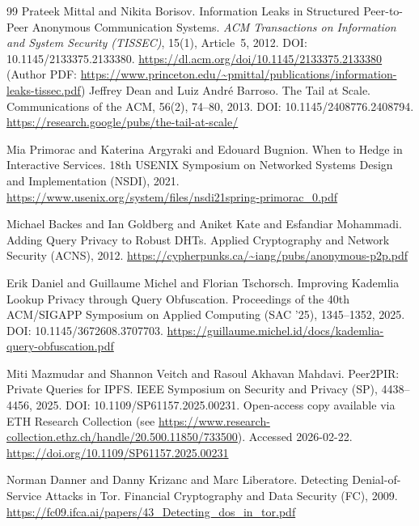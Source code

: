 \documentclass[11pt]{article}
\begin{document}
\begin{thebibliography}{99}
Prateek Mittal and Nikita Borisov.
\newblock Information Leaks in Structured Peer-to-Peer Anonymous Communication Systems.
\newblock \emph{ACM Transactions on Information and System Security (TISSEC)}, 15(1), Article~5, 2012.
\newblock DOI: 10.1145/2133375.2133380.
\newblock \url{https://dl.acm.org/doi/10.1145/2133375.2133380}
\newblock (Author PDF: \url{https://www.princeton.edu/~pmittal/publications/information-leaks-tissec.pdf})
Jeffrey Dean and Luiz Andr{\'e} Barroso.
\newblock The Tail at Scale.
\newblock Communications of the ACM, 56(2), 74--80, 2013.
\newblock DOI: 10.1145/2408776.2408794.
\newblock \url{https://research.google/pubs/the-tail-at-scale/}

Mia Primorac and Katerina Argyraki and Edouard Bugnion.
\newblock When to Hedge in Interactive Services.
\newblock 18th {USENIX} Symposium on Networked Systems Design and Implementation ({NSDI}), 2021.
\newblock \url{https://www.usenix.org/system/files/nsdi21spring-primorac_0.pdf}

Michael Backes and Ian Goldberg and Aniket Kate and Esfandiar Mohammadi.
\newblock Adding Query Privacy to Robust {DHT}s.
\newblock Applied Cryptography and Network Security (ACNS), 2012.
\newblock \url{https://cypherpunks.ca/~iang/pubs/anonymous-p2p.pdf}

Erik Daniel and Guillaume Michel and Florian Tschorsch.
\newblock Improving Kademlia Lookup Privacy through Query Obfuscation.
\newblock Proceedings of the 40th {ACM/SIGAPP} Symposium on Applied Computing (SAC '25), 1345--1352, 2025.
\newblock DOI: 10.1145/3672608.3707703.
\newblock \url{https://guillaume.michel.id/docs/kademlia-query-obfuscation.pdf}

Miti Mazmudar and Shannon Veitch and Rasoul Akhavan Mahdavi.
\newblock Peer2PIR: Private Queries for {IPFS}.
\newblock IEEE Symposium on Security and Privacy (SP), 4438--4456, 2025.
\newblock DOI: 10.1109/SP61157.2025.00231.
\newblock Open-access copy available via ETH Research Collection (see \url{https://www.research-collection.ethz.ch/handle/20.500.11850/733500}). Accessed 2026-02-22.
\newblock \url{https://doi.org/10.1109/SP61157.2025.00231}

Norman Danner and Danny Krizanc and Marc Liberatore.
\newblock Detecting Denial-of-Service Attacks in {Tor}.
\newblock Financial Cryptography and Data Security (FC), 2009.
\newblock \url{https://fc09.ifca.ai/papers/43_Detecting_dos_in_tor.pdf}


\end{thebibliography}
\end{document}
